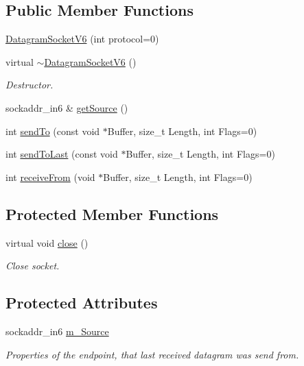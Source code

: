 \subsection*{Public Member Functions}
\begin{DoxyCompactItemize}
\item 
\hyperlink{classDatagramSocketV6_a6ef4a140f2eca611448413ef768ffee3}{Datagram\+Socket\+V6} (int protocol=0)
\item 
virtual \hyperlink{classDatagramSocketV6_a4057e9a144bcc237411d32f76d034b7c}{$\sim$\+Datagram\+Socket\+V6} ()
\begin{DoxyCompactList}\small\item\em Destructor. \end{DoxyCompactList}\item 
sockaddr\+\_\+in6 \& \hyperlink{classDatagramSocketV6_abc2e68bf8b201e882f7ef4c273f02e19}{get\+Source} ()
\item 
int \hyperlink{classDatagramSocketV6_a2dbde712807a402b1cc06aa9093932c3}{send\+To} (const void $\ast$Buffer, size\+\_\+t Length, int Flags=0)
\item 
int \hyperlink{classDatagramSocketV6_ab94e99d82f82e9819e529873aadfa567}{send\+To\+Last} (const void $\ast$Buffer, size\+\_\+t Length, int Flags=0)
\item 
int \hyperlink{classDatagramSocketV6_a86966965f492e9b7f1beb627ca7c4d4b}{receive\+From} (void $\ast$Buffer, size\+\_\+t Length, int Flags=0)
\end{DoxyCompactItemize}
\subsection*{Protected Member Functions}
\begin{DoxyCompactItemize}
\item 
virtual void \hyperlink{classDatagramSocketV6_ad002933c38f60f789a5a425921d9ca4d}{close} ()
\begin{DoxyCompactList}\small\item\em Close socket. \end{DoxyCompactList}\end{DoxyCompactItemize}
\subsection*{Protected Attributes}
\begin{DoxyCompactItemize}
\item 
sockaddr\+\_\+in6 \hyperlink{classDatagramSocketV6_a5a82b5500e449bcd0017284e8b18a9a5}{m\+\_\+\+Source}
\begin{DoxyCompactList}\small\item\em Properties of the endpoint, that last received datagram was send from. \end{DoxyCompactList}\end{DoxyCompactItemize}
